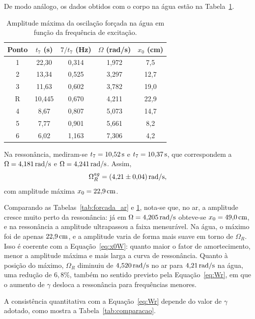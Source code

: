 De modo análogo, os dados obtidos com o corpo na água estão na Tabela~\ref{tab:forcada_agua}.

\begin{table}[H]
\centering
\caption{Amplitude máxima da oscilação forçada na água em função da frequência de excitação.}
\label{tab:forcada_agua}
\begin{tabular}{ccccc}
\toprule
Ponto & $t_7$ (s) & $7/t_7$ (Hz) & $\Omega$ (rad/s) & $x_0$ (cm) \\
\midrule
1 & 22,30 & 0,314 & 1,972 & 7,5 \\
2 & 13,34 & 0,525 & 3,297 & 12,7 \\
3 & 11,63 & 0,602 & 3,782 & 19,0 \\
R & 10,445 & 0,670 & 4,211 & 22,9 \\
4 & 8,67 & 0,807 & 5,073 & 14,7 \\
5 & 7,77 & 0,901 & 5,661 & 8,2 \\
6 & 6,02 & 1,163 & 7,306 & 4,2 \\
\bottomrule
\end{tabular}
\end{table}

Na ressonância, mediram-se $t_7=10{,}52\,\mathrm{s}$ e $t_7=10{,}37\,\mathrm{s}$, que correspondem a $\Omega=4{,}181\,\mathrm{rad/s}$ e $\Omega=4{,}241\,\mathrm{rad/s}$. Assim,
\[
\Omega_R^{ag}=(4{,}21\pm0{,}04)\,\mathrm{rad/s},
\]
com amplitude máxima $x_0=22{,}9\,\mathrm{cm}$.

Comparando as Tabelas~\ref{tab:forcada_ar} e \ref{tab:forcada_agua}, nota-se que, no ar, a amplitude cresce muito perto da ressonância: já em $\Omega=4{,}205\,\mathrm{rad/s}$ obteve-se $x_0=49{,}0\,\mathrm{cm}$, e na ressonância a amplitude ultrapassou a faixa mensurável. Na água, o máximo foi de apenas $22{,}9\,\mathrm{cm}$, e a amplitude varia de forma mais suave em torno de $\Omega_R$. Isso é coerente com a Equação~\eqref{eq:x0W}: quanto maior o fator de amortecimento, menor a amplitude máxima e mais larga a curva de ressonância. Quanto à posição do máximo, $\Omega_R$ diminuiu de $4{,}520\,\mathrm{rad/s}$ no ar para $4{,}21\,\mathrm{rad/s}$ na água, uma redução de $6{,}8\%$, também no sentido previsto pela Equação~\eqref{eq:Wr}, em que o aumento de $\gamma$ desloca a ressonância para frequências menores.

A consistência quantitativa com a Equação~\eqref{eq:Wr} depende do valor de $\gamma$ adotado, como mostra a Tabela~\ref{tab:comparacao}.

